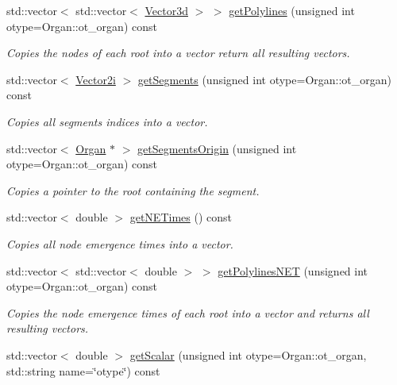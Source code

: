 \begin{DoxyCompactItemize}
std\+::vector$<$ std\+::vector$<$ \hyperlink{classCPlantBox_1_1Vector3d}{Vector3d} $>$ $>$ \hyperlink{classCPlantBox_1_1Plant_a9b14671b9c42aff5f57dd7cf62c3c78f}{get\+Polylines} (unsigned int otype=Organ\+::ot\+\_\+organ) const
\begin{DoxyCompactList}\small\item\em Copies the nodes of each root into a vector return all resulting vectors. \end{DoxyCompactList}\item 
std\+::vector$<$ \hyperlink{classCPlantBox_1_1Vector2i}{Vector2i} $>$ \hyperlink{classCPlantBox_1_1Plant_a3037d23bc42fda923c23338e5d52f76e}{get\+Segments} (unsigned int otype=Organ\+::ot\+\_\+organ) const
\begin{DoxyCompactList}\small\item\em Copies all segments indices into a vector. \end{DoxyCompactList}\item 
std\+::vector$<$ \hyperlink{classCPlantBox_1_1Organ}{Organ} $\ast$ $>$ \hyperlink{classCPlantBox_1_1Plant_a485eaddf68bf18f53e0599ece3e67846}{get\+Segments\+Origin} (unsigned int otype=Organ\+::ot\+\_\+organ) const
\begin{DoxyCompactList}\small\item\em Copies a pointer to the root containing the segment. \end{DoxyCompactList}\item 
std\+::vector$<$ double $>$ \hyperlink{classCPlantBox_1_1Plant_af0d957301cf8a6e46f9aef0970d04b9b}{get\+N\+E\+Times} () const
\begin{DoxyCompactList}\small\item\em Copies all node emergence times into a vector. \end{DoxyCompactList}\item 
std\+::vector$<$ std\+::vector$<$ double $>$ $>$ \hyperlink{classCPlantBox_1_1Plant_ac907fcec0c28302d76b77b943dac7963}{get\+Polylines\+N\+ET} (unsigned int otype=Organ\+::ot\+\_\+organ) const
\begin{DoxyCompactList}\small\item\em Copies the node emergence times of each root into a vector and returns all resulting vectors. \end{DoxyCompactList}\item 
std\+::vector$<$ double $>$ \hyperlink{classCPlantBox_1_1Plant_ad320a4832b6fa51020b0e9b9e7d033bb}{get\+Scalar} (unsigned int otype=Organ\+::ot\+\_\+organ, std\+::string name=\char`\"{}otype\char`\"{}) const

\end{DoxyCompactItemize}
